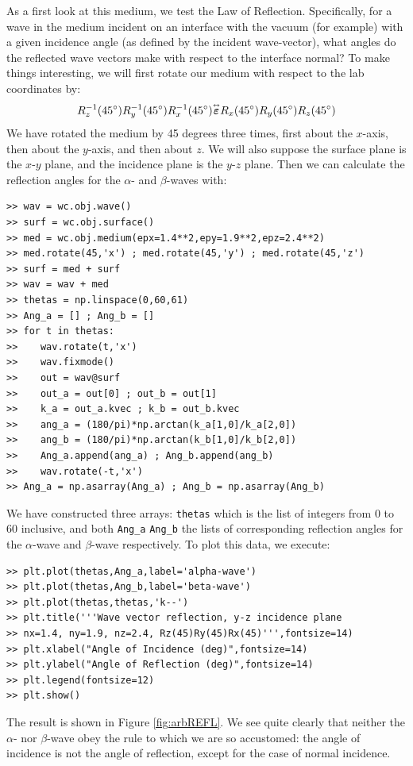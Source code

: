\documentclass[11pt, reqno]{book}%
\newcounter{ct}
\newcommand{\es}{\begin{equation}}
\newcommand{\ef}{\end{equation} \vspace{0.05in}}
\newcommand{\mbf}{\mathbf}
\newcommand{\mbfg}[1]{\mbf{\mbox{\boldmath$#1$}}}
\newcommand{\ve}{\varepsilon}
\newcommand{\tens}{\overset{\text{\tiny$\leftrightarrow$}}}
\newcommand{\tw}[1]{{\tt #1}}
\begin{document}
As a first look at this medium, we test the Law of Reflection. Specifically, for a wave in the medium incident on an interface with the vacuum (for example) with a given incidence angle (as defined by the incident wave-vector), what angles do the reflected wave vectors make with respect to the interface normal? To make things interesting, we will first rotate our medium with respect to the lab coordinates by:
\es
R_z^{-1}(45^\circ)R_y^{-1}(45^\circ)R_x^{-1}(45^\circ) \tens{\mbfg{\ve}} R_x(45^\circ)R_y(45^\circ)R_z(45^\circ)
\ef
\noindent We have rotated the medium by 45 degrees three times, first about the $x$-axis, then about the $y$-axis, and then about $z$. We will also suppose the surface plane is the $x$-$y$ plane, and the incidence plane is the $y$-$z$ plane. Then we can calculate the reflection angles for the $\alpha$- and $\beta$-waves with:
\begin{verbatim}
>> wav = wc.obj.wave()
>> surf = wc.obj.surface()
>> med = wc.obj.medium(epx=1.4**2,epy=1.9**2,epz=2.4**2)
>> med.rotate(45,'x') ; med.rotate(45,'y') ; med.rotate(45,'z')
>> surf = med + surf
>> wav = wav + med
>> thetas = np.linspace(0,60,61)
>> Ang_a = [] ; Ang_b = []
>> for t in thetas:
>>    wav.rotate(t,'x')
>>    wav.fixmode() 
>>    out = wav@surf
>>    out_a = out[0] ; out_b = out[1]
>>    k_a = out_a.kvec ; k_b = out_b.kvec
>>    ang_a = (180/pi)*np.arctan(k_a[1,0]/k_a[2,0])
>>    ang_b = (180/pi)*np.arctan(k_b[1,0]/k_b[2,0])
>>    Ang_a.append(ang_a) ; Ang_b.append(ang_b)
>>    wav.rotate(-t,'x')
>> Ang_a = np.asarray(Ang_a) ; Ang_b = np.asarray(Ang_b)
\end{verbatim}
\noindent We have constructed three arrays: \tw{thetas} which is the list of integers from 0 to 60 inclusive, and both \tw{Ang\_a} \tw{Ang\_b} the lists of corresponding reflection angles for the $\alpha$-wave and $\beta$-wave respectively. To plot this data, we execute:
\begin{verbatim}
>> plt.plot(thetas,Ang_a,label='alpha-wave')
>> plt.plot(thetas,Ang_b,label='beta-wave')
>> plt.plot(thetas,thetas,'k--')
>> plt.title('''Wave vector reflection, y-z incidence plane
>> nx=1.4, ny=1.9, nz=2.4, Rz(45)Ry(45)Rx(45)''',fontsize=14)
>> plt.xlabel("Angle of Incidence (deg)",fontsize=14)
>> plt.ylabel("Angle of Reflection (deg)",fontsize=14)
>> plt.legend(fontsize=12)
>> plt.show()
\end{verbatim}
\noindent The result is shown in Figure \ref{fig:arbREFL}. We see quite clearly that neither the $\alpha$- nor $\beta$-wave obey the rule to which we are so accustomed: the angle of incidence is not the angle of reflection, except for the case of normal incidence.
\end{document}
